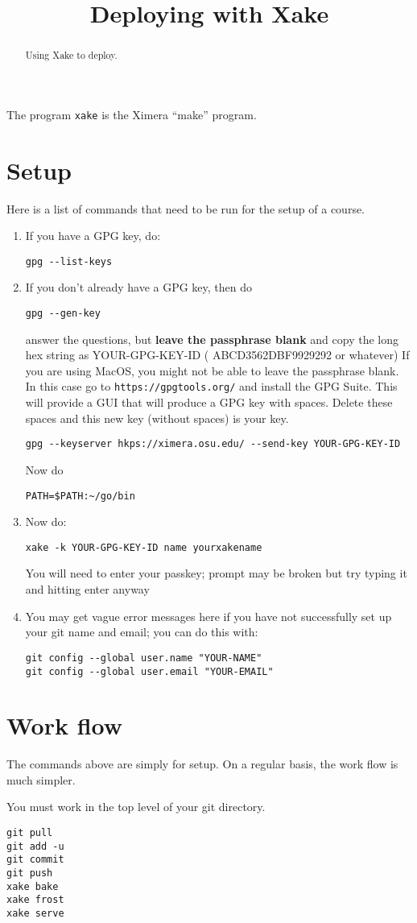 \documentclass{ximera}
\title{Deploying with Xake}
\begin{document}
\begin{abstract}
Using Xake to deploy.
\end{abstract}
\maketitle

The program \verb|xake| is the Ximera ``make'' program.

\section{Setup}

Here is a list of commands that need to be run for the setup of a course. 

\begin{enumerate}
\item If you have a GPG key, do:
\begin{verbatim}
gpg --list-keys
\end{verbatim}
\item If you don’t already have a GPG key, then do
\begin{verbatim}
gpg --gen-key
\end{verbatim}
answer the questions, but \textbf{leave the passphrase blank} and copy
the long hex string as YOUR-GPG-KEY-ID ( ABCD3562DBF9929292 or
whatever) If you are using MacOS, you might not be able to leave the
passphrase blank. In this case go to \verb|https://gpgtools.org/| and
install the GPG Suite.  This will provide a GUI that will produce a
GPG key with spaces. Delete these spaces and this new key (without
spaces) is your key.

\begin{verbatim}
gpg --keyserver hkps://ximera.osu.edu/ --send-key YOUR-GPG-KEY-ID
\end{verbatim}
Now do
\begin{verbatim}
PATH=$PATH:~/go/bin
\end{verbatim}
\item Now do: 
\begin{verbatim}
xake -k YOUR-GPG-KEY-ID name yourxakename
\end{verbatim}
You will need to enter your passkey; prompt may be broken but try typing it and hitting enter anyway

\item You may get vague error messages here if you have not successfully set up your git name and email; you can do this with:
\begin{verbatim}
git config --global user.name "YOUR-NAME"
git config --global user.email "YOUR-EMAIL"
\end{verbatim}
\end{enumerate}


\section{Work flow}

The commands above are simply for setup. On a regular basis, the work flow is much simpler.

You must work in the top level of your git directory.
\begin{verbatim}
git pull
git add -u
git commit
git push
xake bake
xake frost
xake serve
\end{verbatim}




  
\end{document}
